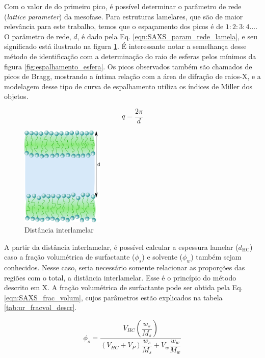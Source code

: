 		Com o valor de \q{} do primeiro pico, é possível determinar o parâmetro de rede (\emph{lattice parameter}) da mesofase. Para estruturas lamelares, que são de maior relevância para este trabalho, temos que o espaçamento dos picos é de \(1:2:3:4...\). O parâmetro de rede, \(d\), é dado pela Eq. \ref{eqn:SAXS_param_rede_lamela}, e seu significado está ilustrado na figura \ref{fig:saxs_distancia_interlamelar}. É interessante notar a semelhança desse método de identificação com a determinação do raio de esferas pelos mínimos da figura \ref{fig:espalhamento_esfera}. Os picos observados também são chamados de picos de Bragg, mostrando a íntima relação com a área de difração de raios-X, e a modelagem desse tipo de curva de espalhamento utiliza os índices de Miller dos objetos.
	
		\begin{equation}
			q = \dfrac{2\pi}{d}
			\label{eqn:SAXS_param_rede_lamela}
		\end{equation}
		
	
		\begin{figure}[h]
			\centering
			\includegraphics[width=0.35\textwidth]{imagens/saxs/distancia_interlamelar}
			\caption{Distância interlamelar}
			\label{fig:saxs_distancia_interlamelar}
		\end{figure}

		A partir da distância interlamelar, é possível calcular a espessura lamelar (\(d_{\text{HC}}\)) caso a fração volumétrica de surfactante (\(\phi_s\)) e solvente (\(\phi_w\)) também sejam conhecidos. Nesse caso, seria necessário somente relacionar as proporções das regiões com o total, a distância interlamelar. Esse é o princípio do método descrito em X. A fração volumétrica de surfactante pode ser obtida pela Eq. \ref{eqn:SAXS_frac_volum}, cujos parâmetros estão explicados na tabela \ref{tab:ur_fracvol_descr}.
		
		\begin{equation}
			\phi_s = \dfrac{V_{\textit{HC}}\left( \dfrac{w_{s}}{M_{s}} \right)}{\left( V_{\textit{HC}} + V_{P} \right)\dfrac{w_{s}}{M_{s}} + V_{w}\dfrac{w_{w}}{M_{w}}}
			\label{eqn:SAXS_frac_volum}
		\end{equation}
		
